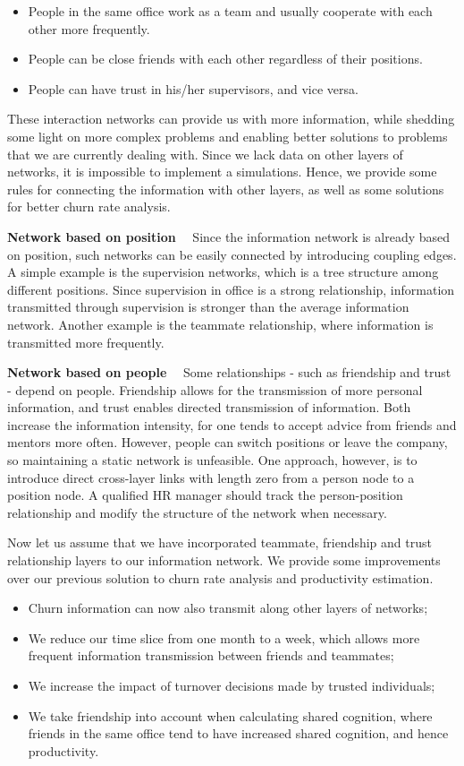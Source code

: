 \documentclass[tcn = 37075, sheet = false, abstract = false]{mcmthesis}
\begin{document}
	\begin{itemize}
		\item People in the same office work as a team and usually cooperate with each other more frequently. 
		\item People can be close friends with each other regardless of their positions.
		\item People can have trust in his/her supervisors, and vice versa.
	\end{itemize}
	
	These interaction networks can provide us with more information, while shedding some light on more complex problems and enabling better solutions to problems that we are currently dealing with. Since we lack data on other layers of networks, it is impossible to implement a simulations. Hence, we provide some rules for connecting the information with other layers, as well as some solutions for better churn rate analysis.
	
	
	\noindent \textbf{Network based on position} \  \  Since the information network is already based on position, such networks can be easily connected by introducing coupling edges. A simple example is the supervision networks, which is a tree structure among different positions. Since supervision in office is a strong relationship, information transmitted through supervision is stronger than the average information network. Another example is the teammate relationship, where information is transmitted more frequently.
	
	
	\noindent \textbf{Network based on people} \ \ Some relationships - such as friendship and trust - depend on people. Friendship allows for the transmission of more personal information, and trust enables directed transmission of information. Both increase the information intensity, for one tends to accept advice from friends and mentors more often. However, people can switch positions or leave the company, so maintaining a static network is unfeasible. One approach, however, is to introduce direct cross-layer links with length zero from a person node to a position node. A qualified HR manager should track the person-position relationship and modify the structure of the network when necessary.
	
	Now let us assume that we have incorporated teammate, friendship and trust relationship layers to our information network. We provide some improvements over our previous solution to churn rate analysis and productivity estimation.
	\begin{itemize}
		\item Churn information can now also transmit along other layers of networks;
		\item We reduce our time slice from one month to a week, which allows more frequent information transmission between friends and teammates;
		\item We increase the impact of turnover decisions made by trusted individuals;
		\item We take friendship into account when calculating shared cognition, where friends in the same office tend to have increased shared cognition, and hence productivity.
		
	\end{itemize}
\end{document}
